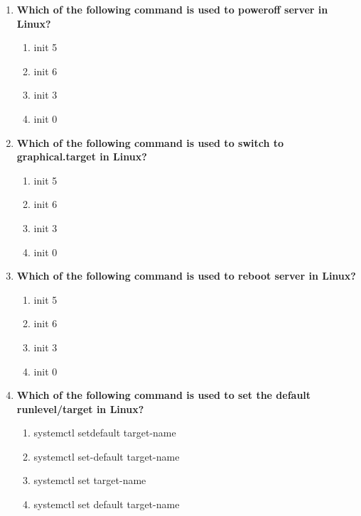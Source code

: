 \begin{flushleft}
\begin{enumerate}
		\item \textbf{Which of the following command is used to poweroff server in Linux?}
		\begin{enumerate}[label=(\alph*)]
			\item init 5 
			\item init 6 
			\item init 3 
			\item init 0  %
		\end{enumerate}
		\bigskip
		\bigskip

		\item \textbf{Which of the following command is used to switch to graphical.target in Linux?}
		\begin{enumerate}[label=(\alph*)]
			\item init 5   %
			\item init 6 
			\item init 3 
			\item init 0   
		\end{enumerate}
		\bigskip
		\bigskip

		\item \textbf{Which of the following command is used to reboot server in Linux?}
		\begin{enumerate}[label=(\alph*)]
			\item init 5  
			\item init 6   %
			\item init 3 
			\item init 0   
		\end{enumerate}
		\bigskip
		\bigskip

		\item \textbf{Which of the following command is used to set the default runlevel/target in Linux?}
		\begin{enumerate}[label=(\alph*)]
			\item systemctl setdefault  target-name
			\item systemctl set-default  target-name  %
			\item systemctl set target-name
			\item systemctl set default target-name
		\end{enumerate}
		\bigskip
		\bigskip
		
	\end{enumerate}
\end{flushleft}
